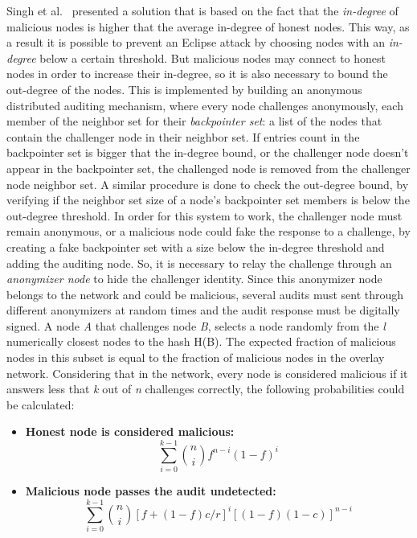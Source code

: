 Singh et al.~\cite{Singh2006} presented a solution that is based on the fact that the \textit{in-degree} of malicious nodes is higher that the average in-degree of honest nodes.
This way, as a result it is possible to prevent an Eclipse attack by choosing nodes with an \textit{in-degree} below a certain threshold.
But malicious nodes may connect to honest nodes in order to increase their in-degree, so it is also necessary to bound the out-degree of the nodes.
This is implemented by building an anonymous distributed auditing mechanism, where every node challenges anonymously, each member of the neighbor set for their \textit{backpointer set}: a list of the nodes that contain the challenger node in their neighbor set.
If entries count in the backpointer set is bigger that the in-degree bound, or the challenger node doesn't appear in the backpointer set, the challenged node is removed from the challenger node neighbor set.
A similar procedure is done to check the out-degree bound, by verifying if the neighbor set size of a node's backpointer set members is below the out-degree threshold.
In order for this system to work, the challenger node must remain anonymous, or a malicious node could fake the response to a challenge, by creating a fake backpointer set with a size below the in-degree threshold and adding the auditing node.
So, it is necessary to relay the challenge through an \textit{anonymizer node} to hide the challenger identity.
Since this anonymizer node belongs to the network and could be malicious, several audits must sent through different anonymizers at random times and the audit response must be digitally signed.
A node \textit{A} that challenges node \textit{B}, selects a node randomly from the \textit{l} numerically closest nodes to the hash H(B).
The expected fraction of malicious nodes in this subset is equal to the fraction of malicious nodes in the overlay network.
Considering that in the network, every node is considered malicious if it answers less that \textit{k} out of \textit{n} challenges correctly, the following probabilities could be calculated:
\begin{itemize}
	\item \textbf{Honest node is considered malicious:}
	\begin{equation}
		\sum_{i=0}^{k-1} \binom{n}{i} f^{n-i} (1-f)^{i}
	\end{equation}
	\item \textbf{Malicious node passes the audit undetected:}
	\begin{equation}
		\sum_{i=0}^{k-1} \binom{n}{i} [f+(1-f)c/r]^{i} [(1-f)(1-c)]^{n-i}
	\end{equation}
\end{itemize}
